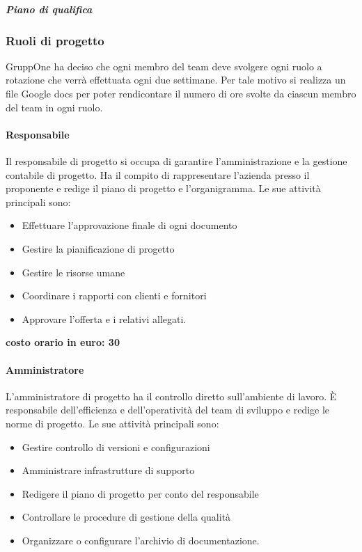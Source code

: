 \documentclass[../norme-di-progetto.tex]{subfiles}
\begin{document}
\subparagraph{Piano di qualifica}%
\label{subp:piano_di_qualifica}

\subsubsection{Ruoli di progetto}%
\label{subs:ruoli_di_progetto}

GruppOne ha deciso che ogni membro del team deve svolgere ogni ruolo a rotazione che verrà effettuata ogni due settimane.
Per tale motivo si realizza un file Google docs per poter rendicontare il numero di ore svolte da ciascun membro del team in ogni ruolo.

\paragraph{Responsabile}%
\label{par:responsabile}
Il responsabile di progetto si occupa di garantire l'amministrazione e la gestione contabile di progetto.
Ha il compito di rappresentare l'azienda presso il proponente e redige il piano di progetto e l'organigramma.
Le sue attività principali sono:

\begin{itemize}
  \item Effettuare l'approvazione finale di ogni documento
  \item Gestire la pianificazione di progetto
  \item Gestire le risorse umane
  \item Coordinare i rapporti con clienti e fornitori
  \item Approvare l'offerta e i relativi allegati.
\end{itemize}

\textbf{costo orario in euro: 30}

\paragraph{Amministratore}%
\label{par:amministratore}
L'amministratore di progetto ha il controllo diretto sull'ambiente di lavoro. È responsabile dell'efficienza e dell'operatività del team di sviluppo e redige le norme di progetto. Le sue attività principali sono:

\begin{itemize}
  \item Gestire controllo di versioni e configurazioni
  \item Amministrare infrastrutture di supporto
  \item Redigere il piano di progetto per conto del responsabile
  \item Controllare le procedure di gestione della qualità
  \item Organizzare o configurare l'archivio di documentazione.
\end{itemize}
\end{document}
